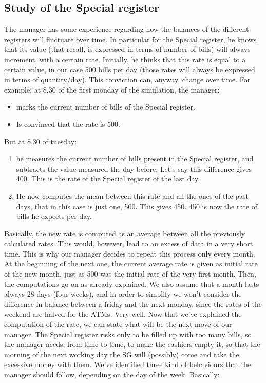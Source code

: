\documentclass{article}
\begin{document}
\subsection{Study of the Special register}
The manager has some experience regarding how the balances of the different registers will fluctuate over time. In particular for the Special register, he knows that its value (that recall, is expressed in terms of number of bills) will always increment, with a certain rate. Initially, he thinks that this rate is equal to a certain value, in our case 500 bills per day (those rates will always be expressed in terms of quantity/day). This conviction can, anyway, change over time. For example: at 8.30 of the first monday of the simulation, the manager: 
\begin{itemize} 
    \item marks the current number of bills of the Special register.
    \item Is convinced that the rate is 500.
\end{itemize}
But at 8.30 of tuesday:
\begin{enumerate}
    \item he measures the current number of bills present in the Special register, and subtracts the value measured the day before. Let's say this difference gives 400. This is the rate of the Special register of the last day.
    \item He now computes the mean between this rate and all the ones of the past days, that in this case is just one, 500. This gives 450. 450 is now the rate of bills he expects per day.
\end{enumerate}
Basically, the new rate is computed as an average between all the previously calculated rates. This would, however, lead to an excess of data in a very short time. This is why our manager decides to repeat this process only every month. At the beginning of the next one, the current average rate is given as initial rate of the new month, just as 500 was the initial rate of the very first month. Then, the computations go on as already explained. We also assume that a month lasts always 28 days (four weeks), and in order to simplify we won't consider the difference in balance between a friday and the next monday, since the rates of the weekend are halved for the ATMs. 
Very well. Now that we've explained the computation of the rate, we can state what will be the next move of our manager.
\newline The Special register risks only to be filled up with too many bills, so the manager needs, from time to time, to make the cashiers empty it, so that the morning of the next working day the SG will (possibly) come and take the excessive money with them. We've identified three kind of behaviours that the manager should follow, depending on the day of the week. Basically:
\end{document}
